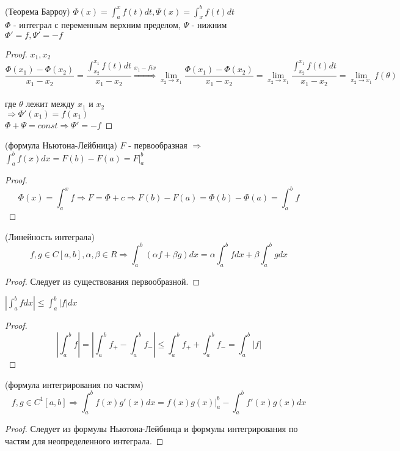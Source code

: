 \begin{properties}
    \item(Теорема Барроу) $\Phi(x) = \int_a^x f(t) dt, \Psi(x) = \int_x^b f(t) dt$ \\
    $\Phi$ - интеграл с переменным верхним пределом, $\Psi$ - нижним \\
    $\Phi' = f, \Psi' = -f$
    \begin{proof}
        $x_1, x_2$ 
        \[\frac {\Phi(x_1) - \Phi(x_2)} {x_1 - x_2}
        = \frac {\int_{x_2}^{x_1} f(t) dt} {x_1 - x_2}  
        \stackrel{x_1- fix}{\Rightarrow} \lim_{x_2 \to x_1} \frac {\Phi(x_1) - \Phi(x_2)} {x_1 - x_2}
        = \lim_{x_2 \to x_1} \frac {\int_{x_2}^{x_1} f(t) dt} {x_1 - x_2}
        = \lim_{x_2 \to x_1} f(\theta)\] \\
        где $\theta$ лежит между $x_1$ и $x_2$ \\
        $\Rightarrow \Phi'(x_1) = f(x_1)$ \\
        $\Phi + \Psi = const \Rightarrow \Psi' = -f$
    \end{proof}

    \item(формула Ньютона-Лейбница) $F$ - первообразная $\Rightarrow$ \\
    $\int_a^b f(x) dx = F(b) - F(a) = F|_a^b$
    \begin{proof}
        \[ \Phi(x) = \int_a^x f \Rightarrow F = \Phi + c \Rightarrow F(b) - F(a)
        = \Phi(b) - \Phi(a) = \int_a^b f \]
    \end{proof}

    \item(Линейность интеграла) \[f, g \in C[a, b], \alpha, \beta \in R \Rightarrow
    \int_a^b (\alpha f + \beta g) dx = \alpha \int_a^b f dx + \beta \int_a^b g dx \] 
    \begin{proof}
        Следует из существования первообразной.
    \end{proof}
    \item $|\int_a^b f dx| \leq \int_a^b |f| dx$
    \begin{proof}
        \[ \left|\int_a^b f\right| = \left|\int_a^b f_+ - \int_a^b f_-\right| \leq
            \int_a^b f_+ + \int_a^b f_- = \int_a^b |f| \]
    \end{proof}
    
    \item(формула интегрирования по частям)
    \[f, g \in C^1[a, b] \Rightarrow
    \int_a^b f(x) g'(x) dx = f(x)g(x)\bigg|_a^b - \int_a^b f'(x)g(x) dx \]

    \begin{proof}
        Следует из формулы Ньютона-Лейбница и формулы интегрирования по частям для неопределенного интеграла.
    \end{proof}


\end{properties}
